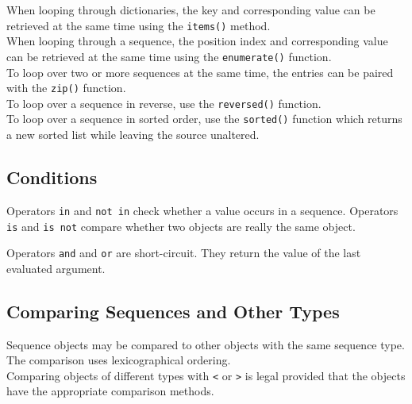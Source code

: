 When looping through dictionaries,
the key and corresponding value can be retrieved at the same time
using the \verb=items()= method.\\
When looping through a sequence,
the position index and corresponding value can be retrieved at the same time
using the \verb=enumerate()= function.\\
To loop over two or more sequences at the same time,
the entries can be paired with the \verb=zip()= function.\\
To loop over a sequence in reverse, use the \verb=reversed()= function.\\
To loop over a sequence in sorted order, use the \verb=sorted()= function
which returns a new sorted list while leaving the source unaltered.

\subsection{Conditions}

Operators \verb=in= and \verb=not in=
check whether a value occurs in a sequence.
Operators \verb=is= and \verb=is not=
compare whether two objects are really the same object.

Operators \verb=and= and \verb=or= are short-circuit.
They return the value of the last evaluated argument.

\subsection{Comparing Sequences and Other Types}

Sequence objects may be compared to other objects with the same sequence type.
The comparison uses lexicographical ordering.\\
Comparing objects of different types with \verb=<= or \verb=>= is legal
provided that the objects have the appropriate comparison methods.
